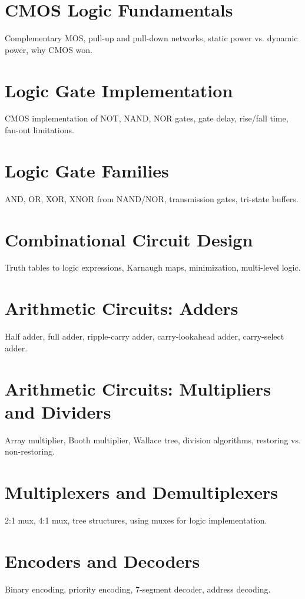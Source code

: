 \chapter{CMOS Logic Fundamentals}
Complementary MOS, pull-up and pull-down networks, static power vs. dynamic power, why CMOS won.

\chapter{Logic Gate Implementation}
CMOS implementation of NOT, NAND, NOR gates, gate delay, rise/fall time, fan-out limitations.

\chapter{Logic Gate Families}
AND, OR, XOR, XNOR from NAND/NOR, transmission gates, tri-state buffers.

\chapter{Combinational Circuit Design}
Truth tables to logic expressions, Karnaugh maps, minimization, multi-level logic.


\chapter{Arithmetic Circuits: Adders}
Half adder, full adder, ripple-carry adder, carry-lookahead adder, carry-select adder.

\chapter{Arithmetic Circuits: Multipliers and Dividers}
Array multiplier, Booth multiplier, Wallace tree, division algorithms, restoring vs. non-restoring.

\chapter{Multiplexers and Demultiplexers}
2:1 mux, 4:1 mux, tree structures, using muxes for logic implementation.

\chapter{Encoders and Decoders}
Binary encoding, priority encoding, 7-segment decoder, address decoding.

